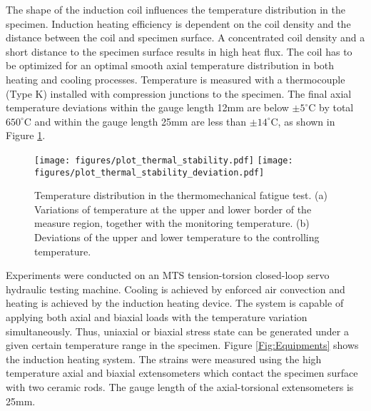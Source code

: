 \documentclass[preprint,5p,twocolumn,11pt,sort&compress]{elsarticle}
\begin{document}
The shape of the induction coil influences the temperature distribution in the specimen. Induction heating efficiency is dependent on the coil density and the distance between the coil and specimen surface. A concentrated coil density and a short distance to the specimen surface results in high heat flux. The coil has to be optimized for an optimal smooth axial temperature distribution in both heating and cooling processes. Temperature is measured with a thermocouple (Type K) installed with compression junctions to the specimen. The final axial temperature deviations within the gauge length 12mm are below $\pm5^\circ$C by total $650^\circ$C and within the gauge length 25mm are less than $\pm14^\circ$C, as shown in Figure \ref{Fig:Temp-Distr}.


\begin{figure}[!ht]
\texttt{[image: figures/plot\_thermal\_stability.pdf]}
\texttt{[image: figures/plot\_thermal\_stability\_deviation.pdf]}
\caption{Temperature distribution in the thermomechanical fatigue test. (a) Variations of temperature at the upper and lower border of the measure region, together with the monitoring temperature. (b) Deviations of the upper and lower temperature to the controlling temperature.}
\label{Fig:Temp-Distr}
\end{figure}


Experiments were conducted on an MTS tension-torsion closed-loop servo hydraulic testing machine. Cooling is achieved by enforced air convection and heating is achieved by the induction heating device. The system is capable of applying both axial and biaxial loads with the temperature variation simultaneously. Thus, uniaxial or biaxial stress state can be generated under a given certain temperature range in the specimen. Figure \ref{Fig:Equipments} shows the induction heating system. The strains were measured using the high temperature axial and biaxial extensometers which contact the specimen surface with two ceramic rods. The gauge length of the axial-torsional extensometers is 25mm.
\end{document}
